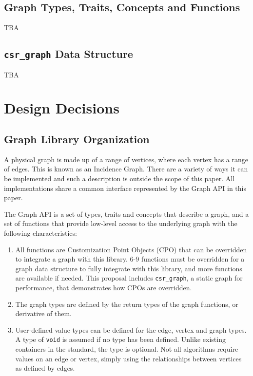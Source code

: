 \documentclass[10pt,onecolumn]{article}
\newcommand{\tcode}[1]{\lstinline[breaklines=true]{#1}}
\begin{document}
\subsection{Graph Types, Traits, Concepts and Functions}
TBA

\subsection{\tcode{csr_graph} Data Structure}
TBA

\section{Design Decisions}
\subsection{Graph Library Organization}
A physical graph is made up of a range of vertices, where each vertex has a range of edges. This is known as an Incidence Graph. There are a variety of 
ways it can be implemented and such a description is outside the scope of this paper. All implementations share a common interface represented by the
Graph API in this paper.

The Graph API is a set of types, traits and concepts that describe a graph, and a set of functions that provide low-level access to the 
underlying graph with the following characteristics:
\begin{enumerate}
\item All functions are Customization Point Objects (CPO) that can be overridden to integrate a graph with this library. 
6-9 functions must be overridden for a graph data structure to fully integrate with this library, and more functions are available if needed. This proposal includes 
\tcode{csr_graph}, a static graph for performance, that demonstrates how CPOs are overridden.
\item The graph types are defined by the return types of the graph functions, or derivative of them.
\item User-defined value types can be defined for the edge, vertex and graph types. A type of \tcode{void} is assumed if no type has been defined.
Unlike existing containers in the standard, the type is optional. Not all algorithms require values on an edge or vertex, simply using the relationships
between vertices as defined by edges.
\end{enumerate}
\end{document}
